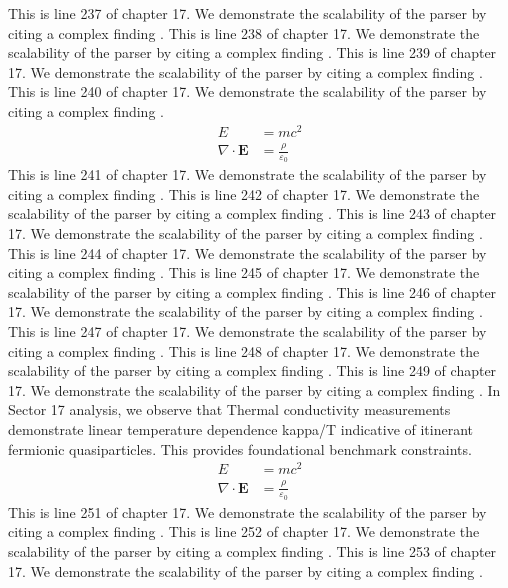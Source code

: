 This is line 237 of chapter 17. We demonstrate the scalability of the parser by citing a complex finding \cite{ref17_237}.
This is line 238 of chapter 17. We demonstrate the scalability of the parser by citing a complex finding \cite{ref17_238}.
This is line 239 of chapter 17. We demonstrate the scalability of the parser by citing a complex finding \cite{ref17_239}.
This is line 240 of chapter 17. We demonstrate the scalability of the parser by citing a complex finding \cite{ref17_240}.
\begin{align*}
  E &= mc^2 \\
  \nabla \cdot \mathbf{E} &= \frac{\rho}{\varepsilon_0}
\end{align*}
This is line 241 of chapter 17. We demonstrate the scalability of the parser by citing a complex finding \cite{ref17_241}.
This is line 242 of chapter 17. We demonstrate the scalability of the parser by citing a complex finding \cite{ref17_242}.
This is line 243 of chapter 17. We demonstrate the scalability of the parser by citing a complex finding \cite{ref17_243}.
This is line 244 of chapter 17. We demonstrate the scalability of the parser by citing a complex finding \cite{ref17_244}.
This is line 245 of chapter 17. We demonstrate the scalability of the parser by citing a complex finding \cite{ref17_245}.
This is line 246 of chapter 17. We demonstrate the scalability of the parser by citing a complex finding \cite{ref17_246}.
This is line 247 of chapter 17. We demonstrate the scalability of the parser by citing a complex finding \cite{ref17_247}.
This is line 248 of chapter 17. We demonstrate the scalability of the parser by citing a complex finding \cite{ref17_248}.
This is line 249 of chapter 17. We demonstrate the scalability of the parser by citing a complex finding \cite{ref17_249}.
In Sector 17 analysis, we observe that Thermal conductivity measurements demonstrate linear temperature dependence kappa/T indicative of itinerant fermionic quasiparticles. This provides foundational benchmark constraints.
\begin{align*}
  E &= mc^2 \\
  \nabla \cdot \mathbf{E} &= \frac{\rho}{\varepsilon_0}
\end{align*}
This is line 251 of chapter 17. We demonstrate the scalability of the parser by citing a complex finding \cite{ref17_251}.
This is line 252 of chapter 17. We demonstrate the scalability of the parser by citing a complex finding \cite{ref17_252}.
This is line 253 of chapter 17. We demonstrate the scalability of the parser by citing a complex finding \cite{ref17_253}.
